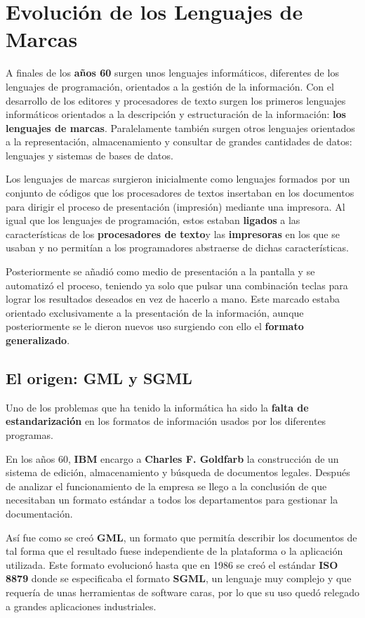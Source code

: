 \section{Evolución de los Lenguajes de Marcas}
A finales de los \textbf{años 60} surgen unos lenguajes informáticos, diferentes de los lenguajes de programación, orientados a la gestión de la información. Con el desarrollo de los editores y procesadores de texto surgen los primeros lenguajes informáticos orientados a la descripción y estructuración de la información: \textbf{los lenguajes de marcas}. Paralelamente también surgen otros lenguajes orientados a la representación, almacenamiento y consultar de grandes cantidades de datos: lenguajes y sistemas de bases de datos.

Los lenguajes de marcas surgieron inicialmente como lenguajes formados por un conjunto de códigos que los procesadores de textos insertaban en los documentos para dirigir el proceso de presentación (impresión) mediante una impresora. Al igual que los lenguajes de programación, estos estaban \textbf{ligados} a las características de los \textbf{procesadores de texto}y las \textbf{impresoras} en los que se usaban y no permitían a los programadores abstraerse de dichas características.

Posteriormente se añadió como medio de presentación a la pantalla y se automatizó el proceso, teniendo ya solo que pulsar una combinación teclas para lograr los resultados deseados en vez de hacerlo a mano. Este marcado estaba orientado exclusivamente a la presentación de la información, aunque posteriormente se le dieron nuevos uso surgiendo con ello el \textbf{formato generalizado}.

\subsection{El origen: GML y SGML}
Uno de los problemas que ha tenido la informática ha sido la \textbf{falta de estandarización} en los formatos de información usados por los diferentes programas.

En los años 60, \textbf{IBM} encargo a \textbf{Charles F. Goldfarb} la construcción de un sistema de edición, almacenamiento y búsqueda de documentos legales. Después de analizar el funcionamiento de la empresa se llego a la conclusión de que necesitaban un formato estándar a todos los departamentos para gestionar la documentación.

Así fue como se creó \textbf{\gls{GML}}, un formato que permitía describir los documentos de tal forma que el resultado fuese independiente de la plataforma o la aplicación utilizada. Este formato evolucionó hasta que en 1986 se creó el estándar \textbf{ISO 8879} donde se especificaba el formato \textbf{\gls{SGML}}, un lenguaje muy complejo y que requería de unas herramientas de software caras, por lo que su uso quedó relegado a grandes aplicaciones industriales.


